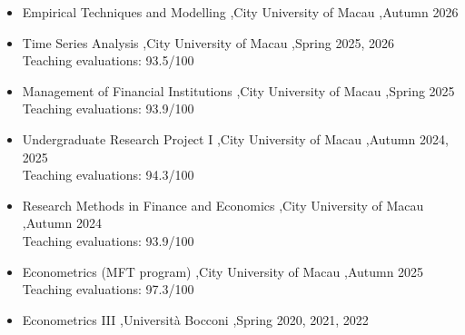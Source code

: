 \documentclass[letterpaper,10pt]{article}
\begin{document}

\begin{itemize}
\item   Empirical Techniques and Modelling \sep City University of Macau \sep Autumn 2026 
  \item Time Series Analysis \sep City University of Macau \sep Spring 2025, 2026\\
        Teaching evaluations: 93.5/100
  \item Management of Financial Institutions \sep City University of Macau \sep Spring 2025\\
        Teaching evaluations: 93.9/100
  \item Undergraduate Research Project I \sep City University of Macau \sep Autumn 2024, 2025\\
        Teaching evaluations: 94.3/100
  \item Research Methods in Finance and Economics \sep City University of Macau \sep Autumn 2024\\
        Teaching evaluations: 93.9/100
\end{itemize}


\begin{itemize}
\item Econometrics (MFT program) \sep City University of Macau \sep Autumn 2025 \\
       Teaching evaluations: 97.3/100
  \item Econometrics III \sep Universit\`a Bocconi \sep Spring 2020, 2021, 2022
\end{itemize}

\end{document}
